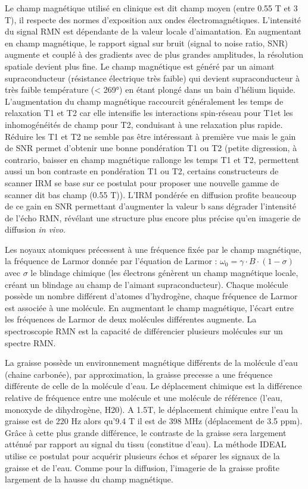 Le champ magnétique utilisé en clinique est dit champ moyen (entre 0.55 T et 3 T), il respecte des normes d’exposition aux ondes électromagnétiques. L’intensité du signal RMN est dépendante de la valeur locale d’aimantation. En augmentant en champ magnétique, le rapport signal sur bruit (signal to noise ratio, SNR) augmente et couplé à des gradients avec de plus grandes amplitudes, la résolution spatiale devient plus fine. Le champ magnétique est généré par un aimant supraconducteur (résistance électrique très faible) qui devient supraconducteur à très faible température (< 269°) en étant plongé dans un bain d’hélium liquide. L'augmentation du champ magnétique raccourcit généralement les temps de relaxation T1 et T2 car elle intensifie les interactions spin-réseau pour T1et les inhomogénéités de champ pour T2, conduisant à une relaxation plus rapide.  Réduire les T1 et T2 ne semble pas être intéressant à première vue mais le gain de SNR permet d’obtenir une bonne pondération T1 ou T2 (petite digression, à contrario, baisser en champ magnétique rallonge les temps T1 et T2, permettent aussi un bon contraste en pondération T1 ou T2, certains constructeurs de scanner IRM se base sur ce postulat pour proposer une nouvelle gamme de scanner dit bas champ (0.55 T)).
L’IRM pondérée en diffusion profite beaucoup de ce gain en SNR permettant d’augmenter la valeur b sans dégrader l’intensité de l’écho RMN, révélant une structure plus encore plus précise qu’en imagerie de diffusion \textit{in vivo}.

Les noyaux atomiques précessent à une fréquence fixée par le champ magnétique, la fréquence de Larmor donnée par l’équation de Larmor : $\omega_0=\gamma \cdot B \cdot (1-\sigma)$ avec $\sigma$ le blindage chimique (les électrons génèrent un champ magnétique locale, créant un blindage au champ de l’aimant supraconducteur). Chaque molécule possède un nombre différent d’atomes d’hydrogène, chaque fréquence de Larmor est associée à une molécule. En augmentant le champ magnétique, l’écart entre les fréquences de Larmor de deux molécules différentes augmente.  La spectroscopie RMN est la capacité de différencier plusieurs molécules sur un spectre RMN.

La graisse possède un environnement magnétique différents de la molécule d’eau (chaine carbonée), par approximation, la graisse precesse a une fréquence différente de celle de la molécule d’eau. Le déplacement chimique est la différence relative de fréquence entre une molécule et une molécule de référence (l’eau, monoxyde de dihydrogène, H20). A 1.5T, le déplacement chimique entre l’eau la graisse est de 220 Hz alors qu’9.4 T il est de 398 MHz (déplacement de 3.5 ppm). Grâce à cette plus grande différence, le contraste de la graisse sera largement atténué par rapport au signal du tissu (constitue d’eau). La méthode IDEAL \cite{Haliot2021} utilise ce postulat pour acquérir plusieurs échos et séparer les signaux de la graisse et de l’eau. Comme pour la diffusion, l’imagerie de la graisse profite largement de la hausse du champ magnétique.

